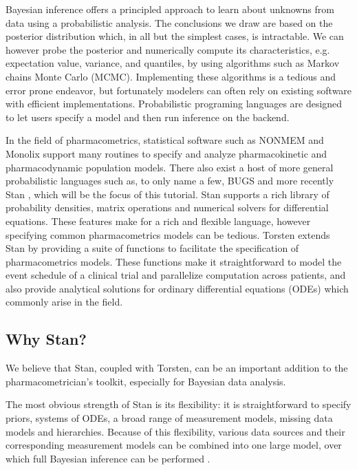 
Bayesian inference offers a principled approach to learn about unknowns from data using a probabilistic analysis.
The conclusions we draw are based on the posterior distribution which, in all but the simplest cases, is intractable.
We can however probe the posterior and numerically compute its characteristics, e.g. expectation value, variance, and quantiles, by using algorithms such as Markov chains Monte Carlo (MCMC).
Implementing these algorithms is a tedious and error prone endeavor, but fortunately modelers can often rely on existing software with efficient implementations.
Probabilistic programing languages are designed to let users specify a model and then run inference on the backend.

In the field of pharmacometrics, statistical software such as NONMEM \cite{author:0000} and Monolix \cite{author:0000} support many routines to specify and analyze pharmacokinetic and pharmacodynamic population models.
There also exist a host of more general probabilistic languages such as, to only name a few, BUGS \cite{author:0000} and more recently Stan \cite{Carpenter:2017}, which will be the focus of this tutorial.
Stan supports a rich library of probability densities, matrix operations and numerical solvers for differential equations.
These features make for a rich and flexible language, however specifying common pharmacometrics models can be tedious.
Torsten extends Stan by providing a suite of functions to facilitate the specification of pharmacometrics models.
These functions make it straightforward to model the event schedule of a clinical trial and parallelize computation across patients, and also provide analytical solutions for ordinary differential equations (ODEs) which commonly arise in the field.


\subsection{Why Stan?}

We believe that Stan, coupled with Torsten, can be an important addition to the pharmacometrician's toolkit, especially for Bayesian data analysis.

The most obvious strength of Stan is its flexibility: it is straightforward to specify priors, systems of ODEs, a broad range of measurement models, missing data models and hierarchies.
Because of this flexibility, various data sources and their corresponding measurement models can be combined into one large model, over which full Bayesian inference can be performed \cite[e.g][]{Weber:2018}.

